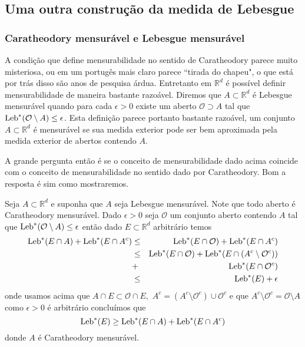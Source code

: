 \subsection*{Uma outra construç\~ao da medida de Lebesgue}













\subsubsection{Caratheodory mensur\'avel e Lebesgue mensur\'avel}




A condição que define mensurabilidade no sentido de 
Caratheodory parece muito misteriosa, ou em 
um portugês mais claro 
parece ``tirada do chapeu", o que está por 
trás disso são anos de pesquisa árdua. 
Entretanto em $\mathbb{R}^d$ é possível definir 
mensurabilidade de maneira bastante razoável. 
Diremos que $A\subset \mathbb{R}^d$ é Lebesgue  
mensurável quando para cada  $\epsilon>0$ 
existe um aberto $\mathcal{O}\supset A$ 
tal que $\textnormal{Leb}^{*}(\mathcal{O}\setminus A)\leq \epsilon$. 
Esta definição parece portanto bastante razoável, 
um conjunto $A\subset \mathbb{R}^d$ é mensurável 
se sua medida exterior  pode ser bem aproximada 
pela medida exterior de abertos contendo $A$.

A grande pergunta então é se o conceito de 
mensurabilidade dado acima coincide com o 
conceito de mensurabilidade 
no sentido dado por Caratheodory. 
Bom  a resposta é sim como mostraremos.



Seja $A\subset \mathbb{R}^d$ e suponha que $A$ 
seja Lebesgue mensurável. 
Note que todo aberto 
é Caratheodory mensurável. 
Dado $\epsilon>0$ seja $\mathcal{O}$ um 
conjunto aberto contendo $A$ 
tal que 
$\textnormal{Leb}^{*}(\mathcal{O}\setminus A)\leq \epsilon$  
então dado $E\subset \mathbb{R}^d$ 
arbitrário temos 
\begin{eqnarray*}
\textnormal{Leb}^{*}(E\cap A)+\textnormal{Leb}^{*}(E\cap A^c)
&\leq& 
\textnormal{Leb}^{*}(E\cap \mathcal{O})+\textnormal{Leb}^{*}(E\cap A^c)
\\
&
\leq 
&
\textnormal{Leb}^{*}(E\cap\mathcal{O})+
\textnormal{Leb}^{*}(E\cap (A^c\setminus \mathcal{O}^c))
\\
&
+
&
 \textnormal{Leb}^{*}(E\cap \mathcal{O}^c)
 \\
 &
 \leq 
 &
\textnormal{Leb}^{*}(E)+\epsilon
\end{eqnarray*}
onde usamos acima que 
$
A\cap E\subset \mathcal{O}\cap E,$ $A^c
=
(A^c\setminus \mathcal{O}^c)\cup \mathcal{O}^c
$ 
e que 
$
A^c\setminus \mathcal{O}^c=\mathcal{O}\setminus A$ como 
$\epsilon>0$ é arbitrário concluímos que
$$
\textnormal{Leb}^{*}(E)\geq \textnormal{Leb}^{*}(E\cap A)+\textnormal{Leb}^{*}(E\cap A^c)
$$
donde $A$ é Caratheodory mensurável.


